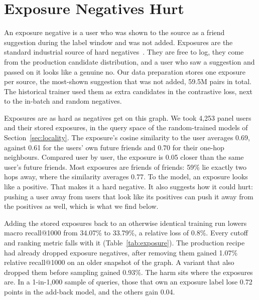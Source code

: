 \section{Exposure Negatives Hurt}
\label{sec:exposure}

 An exposure negative is a user who was shown to the source as a friend suggestion
during the label window and was not added. Exposures are the standard industrial source of hard
negatives~\cite{huang2020ebr}. They are free to log, they come from the production candidate distribution, and a user
who saw a suggestion and passed on it looks like a genuine no. Our data preparation stores one exposure per source, the
most-shown suggestion that was not added, 59.5M pairs in total. The historical trainer used them as extra candidates in
the contrastive loss, next to the in-batch and random negatives.

Exposures are as hard as negatives get on this graph. We took 4{,}253 panel users and their stored exposures, in the
query space of the random-trained models of Section~\ref{sec:locality}. The exposure's cosine similarity to the user
averages 0.69, against 0.61 for the users' own future friends and 0.70 for their one-hop neighbours. Compared user by
user, the exposure is 0.05 closer than the same user's future friends. Most exposures are friends of friends: 59\% lie
exactly two hops away, where the similarity averages 0.77. To the model, an exposure looks like a positive. That makes
it a hard negative. It also suggests how it could hurt: pushing a user away from users that look like its positives can
push it away from the positives as well, which is what we find below.



 Adding the stored exposures back to an otherwise identical training run lowers macro recall@1000 from
34.07\% to 33.79\%, a relative loss of 0.8\%. Every cutoff and ranking metric falls with it (Table~\ref{tab:exposure}).
The production recipe had already dropped exposure negatives, after removing them gained 1.07\% relative recall@1000
on an older snapshot of the graph. A variant that also dropped them before sampling gained 0.93\%. The harm sits where
the exposures are. In a 1-in-1{,}000 sample of queries, those that own an exposure label lose 0.72 points in the
add-back model, and the others gain 0.04.

